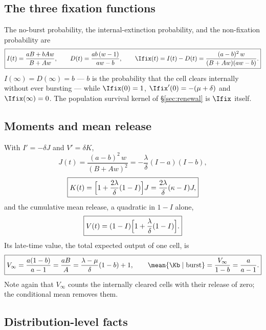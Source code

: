 \subsection{The three fixation functions}

The no-burst probability, the internal-extinction probability, and the
non-fixation probability are
\begin{equation}
\boxed{I(t)=\frac{aB+bAw}{B+Aw},\qquad
D(t)=\frac{ab\,(w-1)}{aw-b},\qquad
\Ifix(t)=I(t)-D(t)=\frac{(a-b)^2\,w}{(B+Aw)(aw-b)}.}
\label{eq:IDIhat}
\end{equation}
$I(\infty)=D(\infty)=b$ --- $b$ is the probability that the cell clears
internally without ever bursting --- while $\Ifix(0)=1$,
$\Ifix'(0)=-(\mu+\delta)$ and $\Ifix(\infty)=0$. The population survival
kernel of \S\ref{sec:renewal} is $\Ifix$ itself.

\subsection{Moments and mean release}

With $I'=-\delta J$ and $V'=\delta K$,
\begin{equation}
\boxed{J(t)=\frac{(a-b)^2\,w}{(B+Aw)^2}=-\frac{\lambda}{\delta}(I-a)(I-b),}
\label{eq:J}
\end{equation}
\begin{equation}
\boxed{K(t)=\Bigl[1+\frac{2\lambda}{\delta}(1-I)\Bigr]J
=\frac{2\lambda}{\delta}(\kappa-I)J,}
\label{eq:K}
\end{equation}
and the cumulative mean release, a quadratic in $1-I$ alone,
\begin{equation}
\boxed{V(t)=(1-I)\Bigl[1+\frac{\lambda}{\delta}(1-I)\Bigr].}
\label{eq:V}
\end{equation}
Its late-time value, the total expected output of one cell, is
\begin{equation}
\boxed{V_\infty=\frac{a(1-b)}{a-1}=\frac{aB}{A}
=\frac{\lambda-\mu}{\delta}(1-b)+1,
\qquad
\mean{\Kb\mid\text{burst}}=\frac{V_\infty}{1-b}=\frac{a}{a-1}.}
\label{eq:Vinf}
\end{equation}
Note again that $V_\infty$ counts the internally cleared cells with their
release of zero; the conditional mean removes them.

\subsection{Distribution-level facts}

